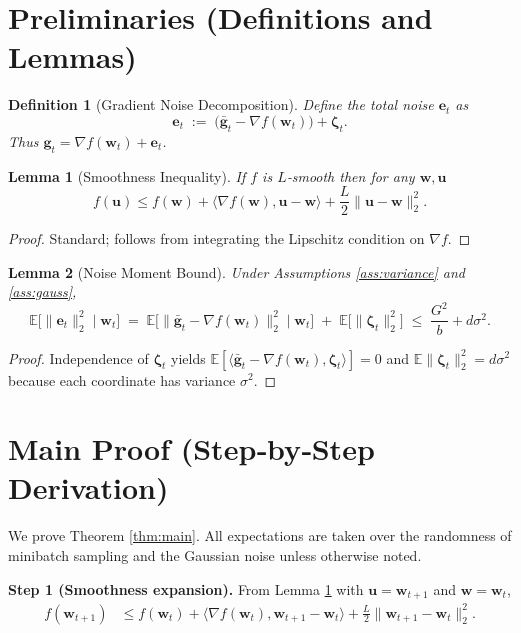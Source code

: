 \documentclass{article}
\newtheorem{lemma}{Lemma}
\newtheorem{definition}{Definition}
\begin{document}
\section*{Preliminaries (Definitions and Lemmas)}
\begin{definition}[Gradient Noise Decomposition]
Define the total noise $\mathbf{e}_t$ as
\[
\mathbf{e}_t\;:=\;\big(\bar{\mathbf{g}}_t-\nabla f(\mathbf{w}_t)\big)+\bm{\zeta}_t .
\]
Thus $\mathbf{g}_t=\nabla f(\mathbf{w}_t)+\mathbf{e}_t$.
\end{definition}
\begin{lemma}[Smoothness Inequality]\label{lem:smooth}
If $f$ is $L$‑smooth then for any $\mathbf{w},\mathbf{u}$
\[
f(\mathbf{u})\le f(\mathbf{w})+\langle\nabla f(\mathbf{w}),\mathbf{u}-\mathbf{w}\rangle+\frac{L}{2}\|\mathbf{u}-\mathbf{w}\|_2^{2}.
\]
\end{lemma}
\begin{proof}
Standard; follows from integrating the Lipschitz condition on $\nabla f$.
\end{proof}
\begin{lemma}[Noise Moment Bound]\label{lem:noise}
Under Assumptions \ref{ass:variance} and \ref{ass:gauss},
\[
\mathbb{E}\big[\|\mathbf{e}_t\|_2^{2}\mid\mathbf{w}_t\big]
\;=\;
\mathbb{E}\big[\|\bar{\mathbf{g}}_t-\nabla f(\mathbf{w}_t)\|_2^{2}\mid\mathbf{w}_t\big]
\;+\;
\mathbb{E}\big[\|\bm{\zeta}_t\|_2^{2}\big]
\;\le\;
\frac{G^{2}}{b}+d\sigma^{2}.
\]
\end{lemma}
\begin{proof}
Independence of $\bm{\zeta}_t$ yields $\mathbb{E}[\langle\bar{\mathbf{g}}_t-\nabla f(\mathbf{w}_t),\bm{\zeta}_t\rangle]=0$ and $\mathbb{E}\|\bm{\zeta}_t\|_2^{2}=d\sigma^{2}$ because each coordinate has variance $\sigma^{2}$.
\end{proof}

\section*{Main Proof (Step‑by‑Step Derivation)}
We prove Theorem \ref{thm:main}. All expectations are taken over the randomness of minibatch sampling and the Gaussian noise unless otherwise noted.

\noindent\textbf{Step 1 (Smoothness expansion).}  
From Lemma \ref{lem:smooth} with $\mathbf{u}=\mathbf{w}_{t+1}$ and $\mathbf{w}=\mathbf{w}_t$,
\begin{align}
f(\mathbf{w}_{t+1})
&\le f(\mathbf{w}_t)+\langle\nabla f(\mathbf{w}_t),\mathbf{w}_{t+1}-\mathbf{w}_t\rangle
      +\frac{L}{2}\|\mathbf{w}_{t+1}-\mathbf{w}_t\|_2^{2}. \tag{3}
\end{align}
\end{document}
